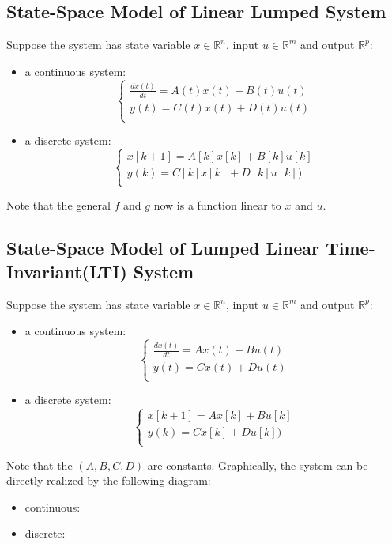 \documentclass[10pt,a4paper,oneside]{article}
\begin{document}
\subsection{State-Space Model of Linear Lumped System}
Suppose the system has state variable $x \in \mathbb{R}^n$, input $u \in \mathbb{R}^m$ and output $\mathbb{R}^p$:
\begin{itemize}
	\item a continuous system:
	\[
	\left\{
	\begin{array}{ll}
	\frac{dx(t)}{dt} = A(t)x(t) + B(t)u(t)\\
	y(t) = C(t)x(t) + D(t)u(t)\\
	\end{array}\right.
	\]
	\item a discrete system:
	\[
	\left\{
	\begin{array}{ll}
	x[k+1] = A[k]x[k] + B[k]u[k]\\
	y(k) = C[k]x[k] + D[k]u[k])\\
	\end{array}\right.
	\]
\end{itemize}
Note that the general $f$ and $g$ now is a function linear to $x$ and $u$.

\subsection{State-Space Model of Lumped Linear Time-Invariant(LTI) System}
Suppose the system has state variable $x \in \mathbb{R}^n$, input $u \in \mathbb{R}^m$ and output $\mathbb{R}^p$:
\begin{itemize}
	\item a continuous system:
	\[
	\left\{
	\begin{array}{ll}
	\frac{dx(t)}{dt} = Ax(t) + Bu(t)\\
	y(t) = Cx(t) + Du(t)\\
	\end{array}\right.
	\]
	\item a discrete system:
	\[
	\left\{
	\begin{array}{ll}
	x[k+1] = Ax[k] + Bu[k]\\
	y(k) = Cx[k] + Du[k])\\
	\end{array}\right.
	\]
\end{itemize}
Note that the $(A, B, C, D)$ are constants. Graphically, the system can be directly realized by the following diagram:
\begin{itemize}
	\item continuous:
	\item discrete:
\end{itemize}
\end{document}
